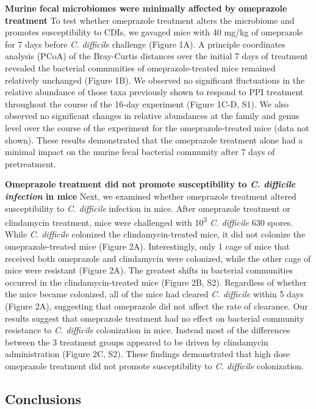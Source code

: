 \documentclass[11pt,]{article}
\begin{document}
\textbf{Murine fecal microbiomes were minimally affected by omeprazole
treatment } To test whether omeprazole treatment alters the microbiome
and promotes susceptibility to CDIs, we gavaged mice with 40 mg/kg of
omeprazole for 7 days before \emph{C. difficile} challenge (Figure 1A).
A principle coordinates analysis (PCoA) of the Bray-Curtis distances
over the initial 7 days of treatment revealed the bacterial communities
of omeprazole-treated mice remained relatively unchanged (Figure 1B). We
observed no significant fluctuations in the relative abundance of those
taxa previously shown to respond to PPI treatment throughout the course
of the 16-day experiment (Figure 1C-D, S1). We also observed no
significant changes in relative abundances at the family and genus level
over the course of the experiment for the omeprazole-treated mice (data
not shown). These results demonstrated that the omeprazole treatment
alone had a minimal impact on the murine fecal bacterial community after
7 days of pretreatment.

\textbf{Omeprazole treatment did not promote susceptibility to \emph{C.
difficile infection} in mice} Next, we examined whether omeprazole
treatment altered susceptibility to \emph{C. difficile} infection in
mice. After omeprazole treatment or clindamycin treatment, mice were
challenged with 10\textsuperscript{3} \emph{C. difficile} 630 spores.
While \emph{C. difficile} colonized the clindamycin-treated mice, it did
not colonize the omeprazole-treated mice (Figure 2A). Interestingly,
only 1 cage of mice that received both omeprazole and clindamycin were
colonized, while the other cage of mice were resistant (Figure 2A). The
greatest shifts in bacterial communities occurred in the
clindamycin-treated mice (Figure 2B, S2). Regardless of whether the mice
became colonized, all of the mice had cleared \emph{C. difficile} within
5 days (Figure 2A), suggesting that omeprazole did not affect the rate
of clearance. Our results suggest that omeprazole treatment had no
effect on bacterial community resistance to \emph{C. difficile}
colonization in mice. Instead most of the differences between the 3
treatment groups appeared to be driven by clindamycin administration
(Figure 2C, S2). These findings demonstrated that high dose omeprazole
treatment did not promote susceptibility to \emph{C. difficile}
colonization.

\subsection{Conclusions}\label{conclusions}
\end{document}
